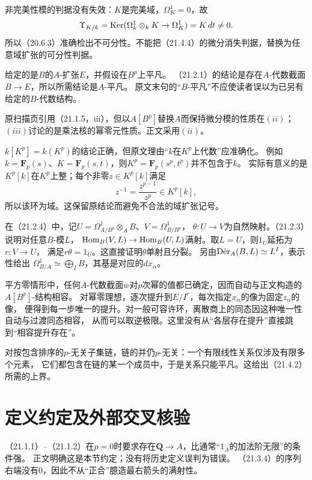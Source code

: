非完美性模的判据没有失效：$K$是完美域，$\Omega^1_K=0$，故
\[
 \Upsilon_{K/k}
 =\Ker(\Omega^1_k\otimes_k K\to\Omega^1_K)
 =K\,dt\ne0.
\]
所以（20.6.3）准确检出不可分性。不能把（21.4.4）的微分消失判据，替换为任意域扩张的可分性判据。

给定的是$B$的$A$-扩张$E$，并假设在$B^p$上平凡。
（21.2.1）的结论是存在$A$-代数截面$B\to E$，所以所需结论是$A$-平凡。
原文末句的“$B$-平凡”不应使读者误以为已另有给定的$B$-代数结构。

原扫描页引用（21.1.5，iii），但以$A[B^p]$替换$A$而保持微分模的性质在$(ii)$；
$(iii)$讨论的是乘法核的幂零元性质。正文采用$(ii)$。

$k[K^p]=k(K^p)$的结论正确，但原文理由“$k$在$K^p$上代数”应准确化。
例如$k=\mathbf F_p(s)$、$K=\mathbf F_p(s,t)$，则$K^p=\mathbf F_p(s^p,t^p)$并不包含于$k$。
实际有意义的是$K^p[k]$在$K^p$上整；每个非零$z\in K^p[k]$满足
\[
 z^{-1}=\frac{z^{p-1}}{z^p}\in K^p[k],
\]
所以该环为域。这保留原结论而避免不合法的域扩张记号。

在（21.2.4）中，记$U=\Omega^1_{A/B^p}\otimes_A B$、$V=\Omega^1_{B/B^p}$，
$\theta:U\to V$为自然映射。（21.2.3）说明对任意$B$-模$L$，
$\Hom_B(V,L)\to\Hom_B(U,L)$满射。取$L=U$，则$1_U$延拓为$r:V\to U$，
满足$r\theta=1_U$。这直接证明$\theta$单射且分裂。
另由$\Der_A(B,L)\simeq L^I$，表示性给出
$\Omega^1_{B/A}\simeq\bigoplus_I B$，其基是对应的$dx_\alpha$。

平方零情形中，任何$A$-代数截面$w$对$p$次幂的值都已确定，因而自动与正文构造的$A[B^p]$-结构相容。
对幂零理想，逐次提升到$E/I^r$，每次指定$x_\alpha$的像为固定$z_\alpha$的像，
便得到每一步唯一的提升。对一般可容许环，离散商上的同态因这种唯一性自动与过渡同态相容，
从而可以取逆极限。这里没有从“各层存在提升”直接跳到“相容提升存在”。

对按包含排序的$p$-无关子集链，链的并仍$p$-无关：一个有限线性关系仅涉及有限多个元素，
它们都包含在链的某一个成员中，于是关系只能平凡。这给出（21.4.2）所需的上界。

\section*{定义约定及外部交叉核验}
（21.1.1）--（21.1.2）在$p=0$时要求存在$\mathbf Q\to A$，比通常“$1_A$的加法阶无限”的条件强。
正文明确这是本节约定；没有将历史定义误判为错误。
（21.3.4）的序列右端没有$0$，因此不从“正合”臆造最右箭头的满射性。

